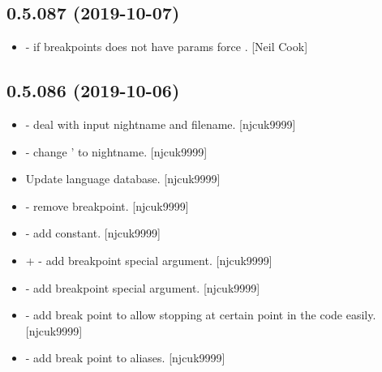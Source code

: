 \documentclass[a4paper,10pt,english]{report}
\begin{document}
\subsection{0.5.087 (2019-10-07)}
\label{\detokenize{misc/changelog:id56}}\begin{itemize}
\item {} 
 - if breakpoints does not have
params force . {[}Neil Cook{]}

\end{itemize}


\subsection{0.5.086 (2019-10-06)}
\label{\detokenize{misc/changelog:id57}}\begin{itemize}
\item {} 
 - deal with input nightname and
filename. {[}njcuk9999{]}

\item {} 
 - change ’ to nightname. {[}njcuk9999{]}

\item {} 
Update language database. {[}njcuk9999{]}

\item {} 
 - remove breakpoint. {[}njcuk9999{]}

\item {} 
 - add 
constant. {[}njcuk9999{]}

\item {} 
 +  - add breakpoint special
argument. {[}njcuk9999{]}

\item {} 
 - add breakpoint special argument.
{[}njcuk9999{]}

\item {} 
 - add break point to allow
stopping at certain point in the code easily. {[}njcuk9999{]}

\item {} 
 - add break point to aliases. {[}njcuk9999{]}

\end{itemize}
\end{document}
